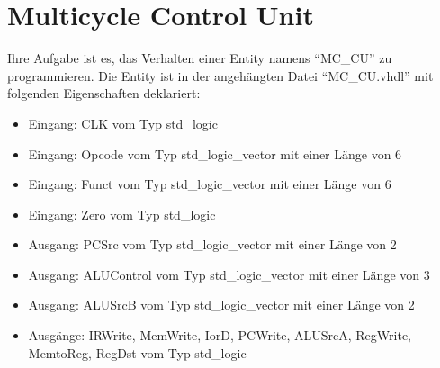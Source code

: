 \documentclass[a4paper,12pt]{article}
\begin{document}
\pagestyle{empty}
\setlength{\parindent}{0em}
\section*{\noindent Multicycle Control Unit }
Ihre Aufgabe ist es, das Verhalten einer Entity  namens "`MC\_CU"' zu programmieren. Die Entity ist in der angeh\"angten Datei "`MC\_CU.vhdl"' mit folgenden Eigenschaften deklariert:

\begin{itemize}
	\item Eingang: CLK vom Typ std\_logic
	\item Eingang: Opcode vom Typ std\_logic\_vector mit einer L\"ange von 6
	\item Eingang: Funct vom Typ std\_logic\_vector mit einer L\"ange von 6
	\item Eingang: Zero vom Typ std\_logic

	\item Ausgang: PCSrc vom Typ std\_logic\_vector mit einer L\"ange von 2
	\item Ausgang: ALUControl vom Typ std\_logic\_vector mit einer L\"ange von 3
	\item Ausgang: ALUSrcB vom Typ std\_logic\_vector mit einer L\"ange von 2
	\item Ausg\"ange: IRWrite, MemWrite, IorD, PCWrite, ALUSrcA, RegWrite, MemtoReg, RegDst vom Typ std\_logic

\end{itemize}
\end{document}
